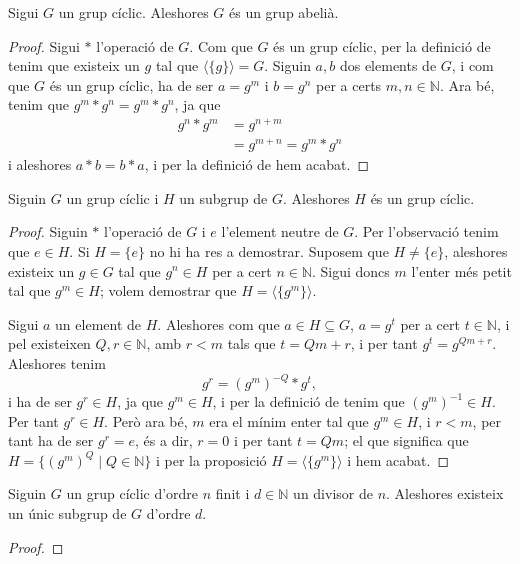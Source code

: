 \documentclass[../../Main.tex]{subfiles}
\begin{document}
	\begin{proposition}
		Sigui \(G\) un grup cíclic. Aleshores \(G\) és un grup abelià.
		\begin{proof}
			Sigui \(\ast\) l'operació de \(G\). Com que \(G\) és un grup cíclic, per la definició de  tenim que existeix un \(g\) tal que \(\langle\{g\}\rangle=G\). Siguin \(a,b\) dos  elements de \(G\), i com que \(G\) és un grup cíclic, ha de ser \(a=g^{m}\) i \(b=g^{n}\) per a certs \(m,n\in\mathbb{N}\). Ara bé, tenim que \(g^{m}\ast g^{n}=g^{m}\ast g^{n}\), ja que
			\begin{align*}
			g^{n}\ast g^{m}&=g^{n+m}\\
			&=g^{m+n}=g^{m}\ast g^{n}
			\end{align*}
			i aleshores \(a\ast b=b\ast a\), i per la definició de  hem acabat.
		\end{proof}
	\end{proposition}
	\begin{proposition}
		Siguin \(G\) un grup cíclic i \(H\) un subgrup de \(G\). Aleshores \(H\) és un grup cíclic.
		\begin{proof}
			Siguin \(\ast\) l'operació de \(G\) i \(e\) l'element neutre de \(G\). Per l'observació  tenim que \(e\in H\). Si \(H=\{e\}\) no hi ha res a demostrar. Suposem que \(H\neq\{e\}\), aleshores existeix un \(g\in G\) tal que \(g^{n}\in H\) per a cert \(n\in\mathbb{N}\). Sigui doncs \(m\) l'enter més petit tal que \(g^{m}\in H\); volem demostrar que \(H=\langle\{g^{m}\}\rangle\).
			
			Sigui \(a\) un element de \(H\). Aleshores com que \(a\in H\subseteq G\), \(a=g^{t}\) per a cert \(t\in\mathbb{N}\), i pel  existeixen \(Q,r\in\mathbb{N}\), amb \(r<m\) tals que \(t=Qm+r\), i per tant \(g^{t}=g^{Qm+r}\). Aleshores tenim
			\[g^{r}=\left(g^{m}\right)^{-Q}\ast g^{t},\]
			i ha de ser \(g^{r}\in H\), ja que \(g^{m}\in H\), i per la definició de  tenim que \(\left(g^{m}\right)^{-1}\in H\). Per tant \(g^{r}\in H\). Però ara bé, \(m\) era el mínim enter tal que \(g^{m}\in H\), i \(r<m\), per tant ha de ser \(g^{r}=e\), és a dir, \(r=0\) i per tant \(t=Qm\); el que significa que \(H=\{\left(g^{m}\right)^{Q}\mid Q\in\mathbb{N}\}\) i per la proposició  \(H=\langle\{g^{m}\}\rangle\) i hem acabat.
		\end{proof}
	\end{proposition}
	\begin{proposition}
		\label{prop:existència i unicitat de subgrups cíclics d'ordres divisors}
		Siguin \(G\) un grup cíclic d'ordre \(n\) finit i \(d\in\mathbb{N}\) un divisor de \(n\). Aleshores existeix un únic subgrup de \(G\) d'ordre \(d\).
		\begin{proof}
		\end{proof}
	\end{proposition}
\end{document}
